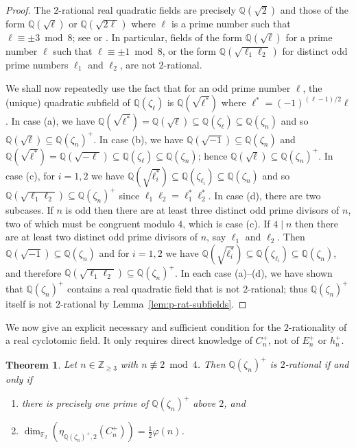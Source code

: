 \documentclass[12pt, a4paper, usenames]{amsart}
\newcommand{\Z}{\mathbb{Z}}
\newcommand{\Q}{\mathbb{Q}}
\newcommand{\F}{\mathbb{F}}
\theoremstyle{plain}
\newtheorem{theorem}{Theorem}[section]
\theoremstyle{remark}
\theoremstyle{definition}
\begin{document}
\begin{proof}
The $2$-rational real quadratic fields are precisely $\Q(\sqrt{2})$ and those of the form 
$\Q(\sqrt{\ell})$ or $\Q(\sqrt{2\ell})$ where $\ell$ is a prime number such that $\ell \equiv \pm 3 \bmod{8}$; see \cite[Example~1.3]{MR4491965} or \cite[Proposition~2.12]{MR4192837}.
In particular, fields of the form 
$\Q(\sqrt{\ell})$ for a prime number $\ell$ such that $\ell \equiv \pm 1 \bmod{8}$, or the form
$\Q(\sqrt{\ell_{1}\ell_{2}})$ for distinct odd prime numbers $\ell_{1}$ and $\ell_{2}$, are not $2$-rational.

We shall now repeatedly use the fact that for an odd prime number $\ell$, 
the (unique) quadratic subfield
of $\Q(\zeta_{\ell})$ is $\Q(\sqrt{\ell^{*}})$ where $\ell^{*}=(-1)^{(\ell-1)/2}\ell$.
In case (a), we have
$\Q(\sqrt{\ell^{*}})=\Q(\sqrt{\ell}) \subseteq \Q(\zeta_{\ell}) \subseteq \Q(\zeta_{n})$
and so $\Q(\sqrt{\ell}) \subseteq \Q(\zeta_{n})^{+}$.
In case (b), we have $\Q(\sqrt{-1}) \subseteq \Q(\zeta_{n})$ and
$\Q(\sqrt{\ell^{*}})=\Q(\sqrt{-\ell}) \subseteq \Q(\zeta_{\ell}) \subseteq \Q(\zeta_{n})$;
hence $\Q(\sqrt{\ell}) \subseteq \Q(\zeta_{n})^{+}$.
In case (c), for $i=1,2$ we have 
$\Q(\sqrt{\ell_{i}^{*}}) \subseteq \Q(\zeta_{\ell_{i}}) \subseteq \Q(\zeta_{n})$ 
and so $\Q(\sqrt{\ell_{1}\ell_{2}}) \subseteq \Q(\zeta_{n})^{+}$ since $\ell_{1}\ell_{2} = \ell_{1}^{*}\ell_{2}^{*}$. In case (d), there are two subcases. 
If $n$ is odd then there are at least three distinct odd prime divisors of $n$, two of which 
must be congruent modulo $4$, which is case (c). If $4 \mid n$ then there are at least 
two distinct odd prime divisors of $n$, say $\ell_{1}$ and $\ell_{2}$. 
Then $\Q(\sqrt{-1}) \subseteq \Q(\zeta_{n})$ and 
for $i=1,2$ we have 
$\Q(\sqrt{\ell_{i}^{*}}) \subseteq \Q(\zeta_{\ell_{i}}) \subseteq \Q(\zeta_{n})$, 
and therefore $\Q(\sqrt{\ell_{1}\ell_{2}}) \subseteq \Q(\zeta_{n})^{+}$.
In each case (a)--(d), we have shown that $\Q(\zeta_{n})^{+}$
contains a real quadratic field that is not $2$-rational; 
thus $\Q(\zeta_{n})^{+}$ itself is not $2$-rational by Lemma~\ref{lem:p-rat-subfields}.
\end{proof}

We now give an explicit necessary and sufficient condition for the $2$-rationality of 
a real cyclotomic field. It
only requires direct knowledge of $C_{n}^{+}$, 
not of $E_{n}^{+}$ or $h_{n}^{+}$.

\begin{theorem}\label{thm:2-rat-cyclo}
Let $n \in \Z_{\geq 3}$ with $n \not \equiv 2 \bmod 4$.
Then $\Q(\zeta_{n})^{+}$ is $2$-rational if and only if
\begin{enumerate}
    \item there is precisely one prime of $\Q(\zeta_{n})^{+}$ above $2$, and
    \item $\dim_{\F_{2}}(\eta_{\Q(\zeta_{n})^{+},2}(C_{n}^{+}))=\frac{1}{2}\varphi(n)$.
\end{enumerate}
\end{theorem}
\end{document}
